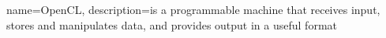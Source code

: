  {
   name=OpenCL,
   description={is a programmable machine that receives input,
                stores and manipulates data, and provides
                output in a useful format}
}